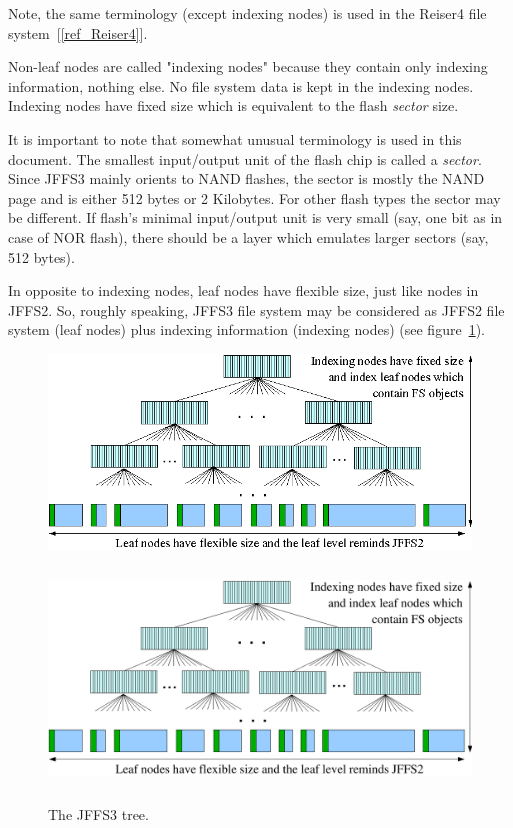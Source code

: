 Note, the same terminology (except indexing nodes) is used in the Reiser4 file
system~[\ref{ref_Reiser4}].

\mbox{Non-leaf} nodes are called "indexing nodes" because they contain only
indexing information, nothing else. No file system data is kept in the indexing
nodes. Indexing nodes have fixed size which is equivalent to the flash
\emph{sector} size.

It is important to note that somewhat unusual terminology is used in this
document. The smallest input/output unit of the flash chip is called a
\emph{sector}. Since JFFS3 mainly orients to NAND flashes, the sector is mostly
the NAND page and is either 512 bytes or 2 Kilobytes. For other flash types the
sector may be different. If flash's minimal input/output unit is very small
(say, one bit as in case of NOR flash), there should be a layer which emulates
larger sectors (say, 512 bytes).

In opposite to indexing nodes, leaf nodes have flexible size, just like nodes
in JFFS2. So, roughly speaking, JFFS3 file system may be considered as JFFS2
file system (leaf nodes) plus indexing information (indexing nodes) (see
figure~\ref{ref_FigureBTree_02}). 

%
%
\begin{figure}[h]
\begin{center}
\begin{htmlonly}
\includegraphics{pics/btree-02.png}
\end{htmlonly}
\includegraphics[width=159mm,height=65mm]{pics/btree-02.pdf}
\end{center}
\caption{The JFFS3 tree.}
\label{ref_FigureBTree_02}
\end{figure}

